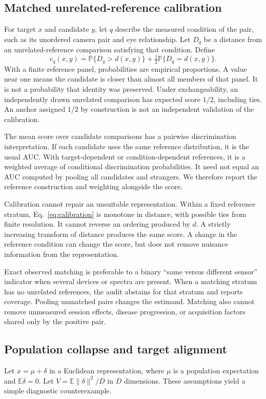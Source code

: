 \documentclass[10pt,twocolumn,letterpaper]{article}
\newcommand{\E}{\mathbb{E}}
\newcommand{\Prob}{\mathbb{P}}
\begin{document}
\subsection{Matched unrelated-reference calibration}
For target $x$ and candidate $y$, let $q$ describe the measured condition of the pair, such as its unordered camera pair and eye relationship. Let $D_q$ be a distance from an unrelated-reference comparison satisfying that condition. Define
\begin{equation}
c_q(x,y)=\Prob\{D_q>d(x,y)\}
 +\tfrac12\Prob\{D_q=d(x,y)\}.
\label{eq:calibration}
\end{equation}
With a finite reference panel, probabilities are empirical proportions. A value near one means the candidate is closer than almost all members of that panel. It is not a probability that identity was preserved. Under exchangeability, an independently drawn unrelated comparison has expected score $1/2$, including ties. An anchor assigned $1/2$ by construction is not an independent validation of the calibration.

The mean score over candidate comparisons has a pairwise discrimination interpretation. If each candidate uses the same reference distribution, it is the usual AUC. With target-dependent or condition-dependent references, it is a weighted average of conditional discrimination probabilities. It need not equal an AUC computed by pooling all candidates and strangers. We therefore report the reference construction and weighting alongside the score.

Calibration cannot repair an unsuitable representation. Within a fixed reference stratum, Eq.~\ref{eq:calibration} is monotone in distance, with possible ties from finite resolution. It cannot reverse an ordering produced by $d$. A strictly increasing transform of distance produces the same score. A change in the reference condition can change the score, but does not remove nuisance information from the representation.

Exact observed matching is preferable to a binary ``same versus different sensor'' indicator when several devices or spectra are present. When a matching stratum has no unrelated references, the audit abstains for that stratum and reports coverage. Pooling unmatched pairs changes the estimand. Matching also cannot remove unmeasured session effects, disease progression, or acquisition factors shared only by the positive pair.

\subsection{Population collapse and target alignment}
Let $x=\mu+\delta$ in a Euclidean representation, where $\mu$ is a population expectation and $\E\delta=0$. Let $V=\E\|\delta\|^2/D$ in $D$ dimensions. These assumptions yield a simple diagnostic counterexample.
\end{document}
